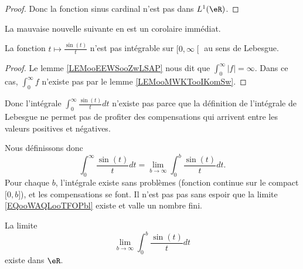 \begin{proof}
	Donc la fonction sinus cardinal n'est pas dans \( L^1(\eR)\).
\end{proof}

La mauvaise nouvelle suivante en est un corolaire immédiat.
\begin{lemma}       \label{LEMooBEQRooHaugKj}
	La fonction \( t\mapsto \frac{ \sin(t) }{ t }\) n'est pas intégrable sur \( \mathopen[ 0 , \infty \mathclose[\) au sens de Lebesgue.
\end{lemma}

\begin{proof}
	Le lemme \ref{LEMooEEWSooZwLSAP} nous dit que \( \int_0^{\infty}| f |=\infty\). Dans ce cas, \( \int_0^{\infty}f\) n'existe pas par le lemme \ref{LEMooMWKTooIKomSw}.
\end{proof}

Donc l'intégrale \( \int_0^{\infty}\frac{ \sin(t) }{ t }dt\) n'existe pas parce que la définition de l'intégrale de Lebesgue ne permet pas de profiter des compensations qui arrivent entre les valeurs positives et négatives.

Nous définissons donc
\begin{equation}        \label{EQooWAQLooTFOPbl}
	\int_0^{\infty}\frac{ \sin(t) }{ t }dt=\lim_{b\to \infty} \int_0^b\frac{ \sin(t) }{ t }dt.
\end{equation}
Pour chaque \( b\), l'intégrale existe sans problèmes (fonction continue sur le compact \( \mathopen[ 0 , b \mathclose]\)), et les compensations se font. Il n'est pas pas sans espoir que la limite \eqref{EQooWAQLooTFOPbl} existe et valle un nombre fini.

\begin{lemma}     \label{LEMooTFVZooRAmjUN}
	La limite
	\begin{equation}
		\lim_{b\to \infty}\int_0^b\frac{ \sin(t) }{ t }dt
	\end{equation}
	existe dans \( \eR\).
\end{lemma}

